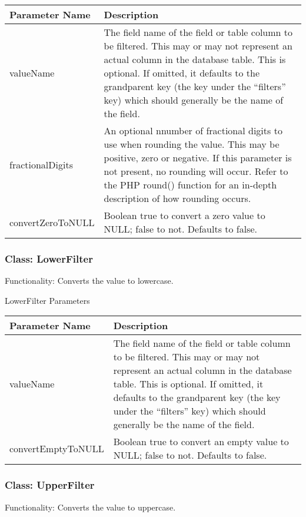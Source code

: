 \documentclass[letterpaper,10pt,english]{sphinxmanual}
\begin{document}
\begin{tabulary}{\linewidth}{|L|L|}
\hline
\textsf{\relax 
Parameter Name
} & \textsf{\relax 
Description
}\\
\hline
valueName
 & 
The field name of the field or table column to be filtered.  This may or may not
represent an actual column in the database table.  This is optional.  If omitted,
it defaults to the grandparent key (the key under the ``filters'' key) which should
generally be the name of the field.
\\
\hline
fractionalDigits
 & 
An optional nnumber of fractional digits to use when rounding the value.  This may
be positive, zero or negative.  If this parameter is not present, no rounding will
occur.  Refer to the PHP round() function for an in-depth description of how
rounding occurs.
\\
\hline
convertZeroToNULL
 & 
Boolean true to convert a zero value to NULL; false to not.  Defaults to false.
\\
\hline\end{tabulary}



\subsubsection{Class: LowerFilter}
\label{jaxFrameworkGuide:class-lowerfilter}
Functionality: Converts the value to lowercase.

LowerFilter Parameters

\begin{tabulary}{\linewidth}{|L|L|}
\hline
\textsf{\relax 
Parameter Name
} & \textsf{\relax 
Description
}\\
\hline
valueName
 & 
The field name of the field or table column to be filtered.  This may or may not
represent an actual column in the database table.  This is optional.  If omitted,
it defaults to the grandparent key (the key under the ``filters'' key) which should
generally be the name of the field.
\\
\hline
convertEmptyToNULL
 & 
Boolean true to convert an empty value to NULL; false to not.  Defaults to false.
\\
\hline\end{tabulary}



\subsubsection{Class: UpperFilter}
\label{jaxFrameworkGuide:class-upperfilter}
Functionality: Converts the value to uppercase.
\end{document}
